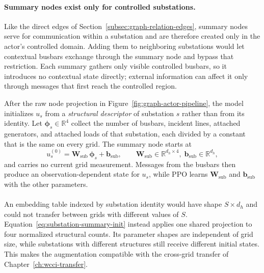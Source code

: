 {\color{clarif}
\paragraph{Summary nodes exist only for controlled substations.}
Like the direct edges of Section~\ref{subsec:graph-relation-edges}, summary nodes
serve for communication within a substation and are therefore created only in the
actor's controlled domain. Adding them to neighboring substations would let
contextual busbars exchange through the summary node and bypass that restriction.
Each summary gathers only visible controlled busbars, so it introduces no
contextual state directly; external information can affect it only through
messages that first reach the controlled region.
}
\par\medskip
\noindent After the raw node projection in
Figure~\ref{fig:graph-actor-pipeline}, the model initializes $u_s$ from a
\emph{structural descriptor} of substation $s$ rather than from its identity.
Let $\boldsymbol\phi_s\in\mathbb R^{4}$ collect the number of busbars, incident
lines, attached generators, and attached loads of that substation, each divided
by a constant that is the same on every grid. The summary node starts at
\begin{equation}
  u_s^{(0)} = \mathbf W_{\mathrm{sub}}\,\boldsymbol\phi_s + \mathbf b_{\mathrm{sub}},
  \qquad
  \mathbf W_{\mathrm{sub}}\in\mathbb R^{d_h\times 4},\;
  \mathbf b_{\mathrm{sub}}\in\mathbb R^{d_h},
  \label{eq:substation-summary-init}
\end{equation}
and carries no current grid measurement. Messages from the busbars then produce
an observation-dependent state for $u_s$, while PPO learns
$\mathbf W_{\mathrm{sub}}$ and $\mathbf b_{\mathrm{sub}}$ with the other
parameters.
\\
\\
{\color{clarif}
An embedding table indexed by substation identity would have shape
$S\times d_h$ and could not transfer between grids with different values of
$S$. Equation~\ref{eq:substation-summary-init} instead applies one shared
projection to four normalized structural counts. Its parameter shapes are
independent of grid size, while substations with different structures still
receive different initial states. This makes the augmentation compatible with
the cross-grid transfer of Chapter~\ref{ch:wcci-transfer}.
}

